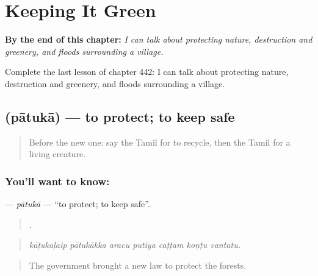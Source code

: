 
\chapter{Keeping It Green}
\label{ch:ta-keeping-it-green}

\begin{chapteropening}
\textbf{By the end of this chapter:} \emph{I can talk about protecting nature, destruction and greenery, and floods surrounding a village.}

Complete the last lesson of chapter 442: I can talk about protecting nature, destruction and greenery, and floods surrounding a village.
\end{chapteropening}

\section[\texorpdfstring{\ta{பாதுகா} (pātukā)}{பாதுகா (pātukā)}]{ (pātukā) — to protect; to keep safe}

\label{lesson:TA-C442-patuka}



\begin{quote}
Before the new one: say the Tamil for to recycle, then the Tamil for a living creature.
\end{quote}

\subsection*{You'll want to know: }
\textbf{} — \emph{pātukā} — \textquotedblleft{}to protect; to keep safe\textquotedblright{}.

\begin{quote}
      .
\end{quote}

\begin{quote}
\emph{kāṭukaḷaip pātukākka aracu putiya caṭṭam koṇṭu vantatu.}
\end{quote}

\begin{quote}
The government brought a new law to protect the forests.
\end{quote}

